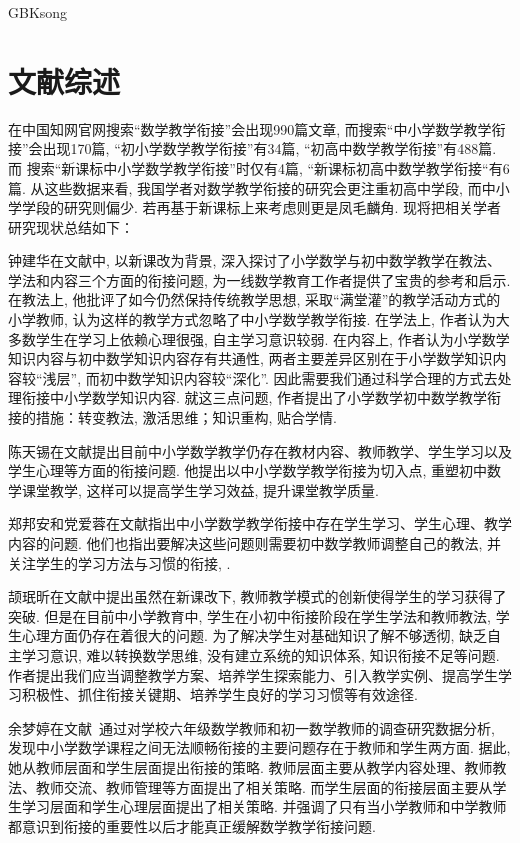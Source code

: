 \documentclass[a4paper,12pt,twoside]{ctexart}
\begin{document}
\begin{CJK*}{GBK}{song}
\section{文献综述}

    在中国知网官网搜索“数学教学衔接”会出现990篇文章, 而搜索“中小学数学教学衔接”会出现170篇, “初小学数学教学衔接”有34篇, “初高中数学教学衔接”有488篇. 而 搜索“新课标中小学数学教学衔接”时仅有4篇, “新课标初高中数学教学衔接“有6篇. 从这些数据来看, 我国学者对数学教学衔接的研究会更注重初高中学段, 而中小学学段的研究则偏少. 若再基于新课标上来考虑则更是凤毛麟角. 现将把相关学者研究现状总结如下：

    钟建华在文献\cite{zhong1}中, 以新课改为背景, 深入探讨了小学数学与初中数学教学在教法、学法和内容三个方面的衔接问题, 为一线数学教育工作者提供了宝贵的参考和启示. 在教法上, 他批评了如今仍然保持传统教学思想, 采取“满堂灌”的教学活动方式的小学教师, 认为这样的教学方式忽略了中小学数学教学衔接. 在学法上, 作者认为大多数学生在学习上依赖心理很强, 自主学习意识较弱. 在内容上, 作者认为小学数学知识内容与初中数学知识内容存有共通性, 两者主要差异区别在于小学数学知识内容较“浅层”, 而初中数学知识内容较“深化”. 因此需要我们通过科学合理的方式去处理衔接中小学数学知识内容. 就这三点问题, 作者提出了小学数学初中数学教学衔接的措施：转变教法, 激活思维；知识重构, 贴合学情.

    陈天锡在文献\cite{chen}提出目前中小学数学教学仍存在教材内容、教师教学、学生学习以及学生心理等方面的衔接问题. 他提出以中小学数学教学衔接为切入点, 重塑初中数学课堂教学, 这样可以提高学生学习效益, 提升课堂教学质量.

    郑邦安和党爱蓉在文献\cite{zheng}指出中小学数学教学衔接中存在学生学习、学生心理、教学内容的问题. 他们也指出要解决这些问题则需要初中数学教师调整自己的教法, 并关注学生的学习方法与习惯的衔接, .

    颉珉昕在文献\cite{zhe}中提出虽然在新课改下, 教师教学模式的创新使得学生的学习获得了突破. 但是在目前中小学教育中, 学生在小初中衔接阶段在学生学法和教师教法, 学生心理方面仍存在着很大的问题. 为了解决学生对基础知识了解不够透彻, 缺乏自主学习意识, 难以转换数学思维, 没有建立系统的知识体系, 知识衔接不足等问题. 作者提出我们应当调整教学方案、培养学生探索能力、引入教学实例、提高学生学习积极性、抓住衔接关键期、培养学生良好的学习习惯等有效途径.

    余梦婷在文献\cite{yu}~通过对学校六年级数学教师和初一数学教师的调查研究数据分析, 发现中小学数学课程之间无法顺畅衔接的主要问题存在于教师和学生两方面. 据此, 她从教师层面和学生层面提出衔接的策略. 教师层面主要从教学内容处理、教师教法、教师交流、教师管理等方面提出了相关策略. 而学生层面的衔接层面主要从学生学习层面和学生心理层面提出了相关策略. 并强调了只有当小学教师和中学教师都意识到衔接的重要性以后才能真正缓解数学教学衔接问题.


\end{CJK*}
\end{document}
